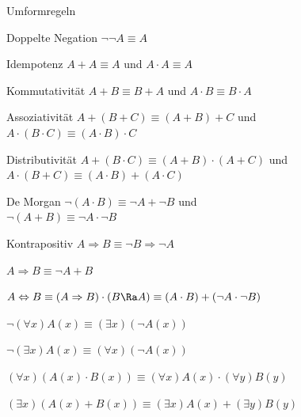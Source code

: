 \documentclass[german,color,6pt]{latex4ei/latex4ei_sheet}
\begin{document}
\begin{sectionbox}
\begin{cookbox}{Umformregeln}
	\item Doppelte Negation $\neg \neg A \equiv A$
	\item Idempotenz $ A + A \equiv A$ und $ A \cdot A \equiv A$
	\item Kommutativität $A + B \equiv B + A$ und $A \cdot B \equiv B \cdot A$ 
	\item Assoziativität $A + (B + C) \equiv (A + B) + C$ und \\ $A \cdot (B \cdot C) \equiv (A \cdot B) \cdot C$
	\item Distributivität $A + (B \cdot C) \equiv (A + B) \cdot (A + C)$ und \\ $A \cdot (B + C) \equiv (A \cdot B) + (A \cdot C)$
	\item De Morgan $\neg(A \cdot B) \equiv \neg A + \neg B$ und \\ $\neg(A + B) \equiv \neg A \cdot \neg B$
	\item Kontrapositiv $A \Rightarrow B \equiv \neg B \Rightarrow \neg A$
	\item $ A \Rightarrow B \equiv \neg A + B$
	\item $ A \Leftrightarrow B \equiv (A \Rightarrow B ) \cdot (B \Ra A) \equiv (A \cdot B) + (\neg A \cdot \neg B) $
	\item $ \neg (\forall x)A(x) \equiv (\exists x)(\neg A(x))$
	\item $ \neg (\exists x) A(x) \equiv (\forall x) (\neg{}A(x)) $
	\item $ (\forall x)(A(x) \cdot B(x)) \equiv (\forall x)A(x) \cdot (\forall y )B(y)$
	\item $ (\exists x)(A(x) + B(x)) \equiv (\exists x)A(x) + (\exists y)B(y)$
\end{cookbox}
\end{sectionbox}
\end{document}
